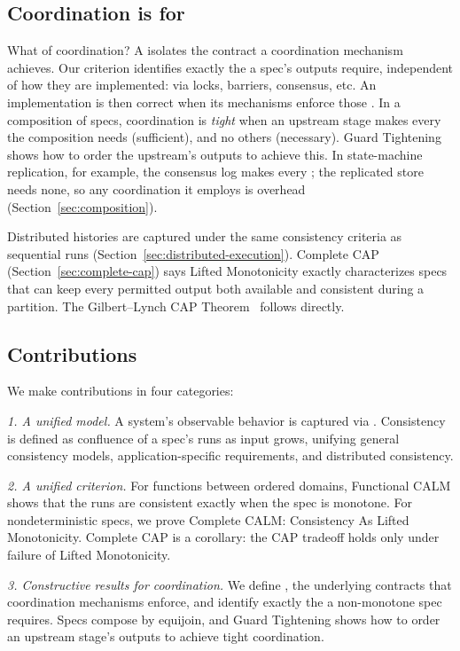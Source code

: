 \subsection{Coordination is for \commitment}
What of coordination?  A \commitment isolates the contract a coordination
mechanism achieves.  Our criterion identifies exactly the \commitments a
spec's outputs require, independent of how they are implemented: via locks,
barriers, consensus, etc.  An implementation is then correct when its
mechanisms enforce those \commitments.
In a composition of specs, coordination is \emph{tight}
when an upstream stage makes every \commitment the composition needs (sufficient), and no others (necessary).  Guard Tightening shows how to order the upstream's outputs to achieve this.  In state-machine replication, for example, the consensus log
makes every \commitment; the replicated store needs none, so any coordination it employs is overhead (Section~\ref{sec:composition}).

Distributed histories are captured under the same consistency criteria as
sequential runs (Section~\ref{sec:distributed-execution}).  Complete CAP
(Section~\ref{sec:complete-cap}) says Lifted Monotonicity exactly characterizes specs
that can keep every permitted output both available and consistent during a
partition.  The Gilbert--Lynch CAP Theorem~\cite{gilbert2002cap} follows directly.

\subsection{Contributions}
We make contributions in four categories:

\noindent
\emph{1. A unified model.} A system's observable behavior is captured via
        \spectype[s]. Consistency is defined as
        confluence of a spec's runs as input grows, unifying general consistency models,
        application-specific requirements, and distributed consistency.

\noindent
\emph{2. A unified criterion.} For functions between ordered domains,
        Functional CALM shows that the runs are consistent exactly when the spec is monotone. For nondeterministic specs,
        we prove Complete CALM: Consistency As Lifted Monotonicity. Complete CAP is a corollary:
        the CAP tradeoff holds only under failure of Lifted Monotonicity.

\noindent
\emph{3. Constructive results for coordination.} We define \commitments,
        the underlying contracts that coordination mechanisms enforce,
        and identify exactly the \commitments a non-monotone spec requires.
        Specs compose by equijoin, and Guard Tightening shows how to order an
        upstream stage's outputs to achieve tight coordination.

